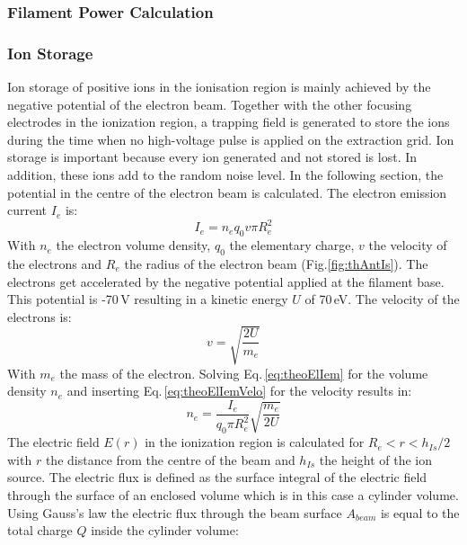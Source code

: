 	
		\subsubsection{Filament Power Calculation }
		
		\subsubsection{Ion Storage }\label{chap:IonStor}
		Ion storage of positive ions in the ionisation region is mainly achieved by the negative potential of the electron beam. Together with the other focusing electrodes in the ionization region, a trapping field is generated to store the ions during the time when no high-voltage pulse is applied on the extraction grid. Ion storage is important because every ion generated and not stored is lost. In addition, these ions add to the random noise level. In the following section, the potential in the centre of the electron beam is calculated. The electron emission current $I_{e}$ is:
		\begin{equation}
			I_{e} = n_e q_0 v\pi R_e^2
			\label{eq:theoElIem}
		\end{equation}
		With $n_e$ the electron volume density, $q_0$ the elementary charge, $v$ the velocity of the electrons and $R_e$ the radius of the electron beam (Fig.\ref{fig:thAntIs}). The electrons get accelerated by the negative potential applied at the filament base. This potential is -70\,\si{\volt} resulting in a kinetic energy $U$ of 70\,\si{\electronvolt}. The velocity of the electrons is:
		\begin{equation}
			v = \sqrt{\frac{2 U}{m_e}}
			\label{eq:theoElIemVelo}
		\end{equation}
		With $m_e$ the mass of the electron. Solving Eq.\,\eqref{eq:theoElIem} for the volume density $n_e$ and inserting Eq.\,\eqref{eq:theoElIemVelo} for the velocity results in:
		\begin{equation}
			n_e = \frac{I_e}{q_0 \pi R_e^2}\sqrt{\frac{m_e}{2U}}						\label{eq:theoElIemNe}
		\end{equation}
		The electric field $E(r)$ in the ionization region is calculated for $R_e<r<h_{Is}/2$ with $r$ the distance from the centre of the beam and $h_{Is}$ the height of the ion source. The electric flux is defined as the surface integral of the electric field through the surface of an enclosed volume which is in this case a cylinder volume. Using Gauss's law the electric flux through the beam surface $A_{beam}$ is equal to the total charge $Q$ inside the cylinder volume:
